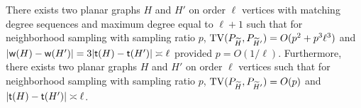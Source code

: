 
\begin{lemma} \label{lmm:lower-planar}
There exists two planar graphs $ H $ and $ H' $ on order $ \ell $ vertices with matching degree sequences and maximum degree equal to $ \ell + 1 $ such that for neighborhood sampling with sampling ratio $ p $, $ {\rm TV}(P_{{\widetilde{H}}}, P_{{\widetilde{H}}'}) = O(p^2 + p^3\ell^3) $ and $ |{\mathsf{w}}(H) - {\mathsf{w}}(H')| = 3|{\mathsf{t}}(H) - {\mathsf{t}}(H')| \asymp \ell $ provided $ p = O(1/\ell) $.
Furthermore, there exists two planar graphs $ H $ and $ H' $ on order $ \ell $ vertices such that for neighborhood sampling with sampling ratio $ p $, $ {\rm TV}(P_{{\widetilde{H}}}, P_{{\widetilde{H}}'}) = O(p) $ and $ |{\mathsf{t}}(H) - {\mathsf{t}}(H')| \asymp \ell $.
\end{lemma}

